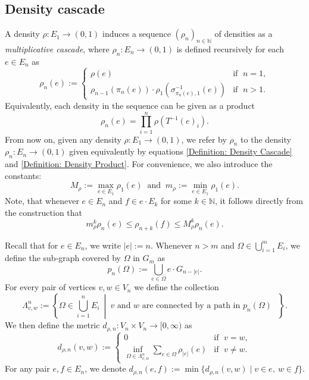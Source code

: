 \documentclass{amsart}
\numberwithin{equation}{section}
\theoremstyle{definition}
\theoremstyle{remark}
\newcommand{\N}{\mathbb{N}}
\begin{document}
\subsection{Density cascade}
A density \(\rho\colon E_1\to (0,1)\) induces a sequence \((\rho_n)_{n\in\N}\) of densities as a \emph{multiplicative cascade}, where \(\rho_n\colon E_n\to (0,1)\) is defined recursively for each \(e\in E_n\) as
    \begin{equation}\label{Definition: Density Cascade}
        \rho_n(e):=
        \begin{cases}
            \rho(e)&\text{if }\;n=1, \\
            \rho_{n-1}(\pi_n(e))\cdot \rho_1(\sigma_{\pi_n(e),1}^{-1}(e)) &\text{if }\;n>1.
        \end{cases}
    \end{equation}
Equivalently, each density in the sequence can be given as a product
    \begin{equation}\label{Definition: Density Product}
        \rho_n(e)=\prod_{i=1}^n\rho(T^{-1}(e)_i).
    \end{equation}
From now on, given any density \(\rho\colon E_1\to (0,1)\), we refer by \(\rho_n\) to the density \(\rho_n\colon E_n\to (0,1)\) given equivalently by equations \eqref{Definition: Density Cascade} and \eqref{Definition: Density Product}. For convenience, we also introduce the constants:
    \[
        M_\rho:=\max_{e\in E_1}\rho_1(e)\;\;\text{and}\;\;m_\rho:=\min_{e\in E_1}\rho_1(e).
    \]
Note, that whenever \(e\in E_n\) and \(f\in e\cdot E_k\) for some \(k\in\N\), it follows directly from the construction that
    \begin{equation}\label{Equation: Max-min level bound}
        m_\rho^k\rho_n(e)\leq\rho_{n+k}(f)\leq M_\rho^k\rho_n(e).
    \end{equation}

Recall that for $e\in E_n$, we write $\lvert e \rvert:=n$. Whenever \(n>m\) and \(\Omega\in\bigcup_{i=1}^m E_i\), we define the sub-graph covered by \(\Omega\) in \(G_m\) as 
    \[
        p_n(\Omega):=\bigcup_{e\in \Omega}e\cdot G_{n-\lvert e \rvert}.
    \]
For every pair of vertices \(v,w\in V_n\) we define the collection
    \[
        \Lambda_{v,w}^n:=\left\{ \Omega\in\bigcup_{i=1}^nE_i\ \middle\vert\ v \text{ and } w\text{ are connected by a path in \(p_n(\Omega)\) } \right\}.
    \]
We then define the metric \(d_{\rho,n}\colon V_n\times V_n\to[0,\infty)\) as
\[
    d_{\rho,n}(v,w):=
    \begin{cases}
        0 &\text{if }\; v=w, \\
        \displaystyle\inf_{\Omega\in \Lambda_{v,w}^n}\displaystyle\sum_{e\in\Omega}\rho_{\lvert e \rvert}(e)& \text{if }\;v\neq w.
    \end{cases}      
\]
For any pair \(e,f\in E_n\), we denote \(d_{\rho,n}(e,f):=\min\{d_{\rho,n}(v,w)\mid v\in e,\:w\in f\}\).
\end{document}
